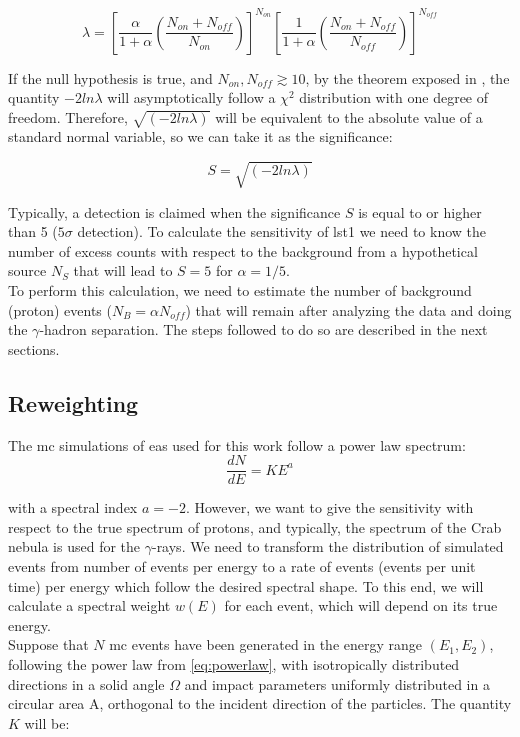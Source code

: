 \documentclass[main.tex]{subfiles}
\begin{document}
\begin{equation}
  \lambda = \left[ \frac{\alpha}{1+\alpha}\left( \frac{N_{on}+N_{off}}{N_{on}}\right) \right]^{N_{on}} \left[ \frac{1}{1+\alpha}\left( \frac{N_{on}+N_{off}}{N_{off}}\right)\right]^{N_{off}}
\end{equation}

If the null hypothesis is true, and $N_{on}, N_{off} \gtrsim 10$, by the theorem exposed in \cite{1983LiMa}, the quantity $-2ln\lambda$ will asymptotically follow a $\chi^2$ distribution with one degree of freedom. Therefore, $\sqrt{(-2ln\lambda)}$ will be equivalent to the absolute value of a standard normal variable, so we can take it as the significance:

\begin{equation}
  S = \sqrt{(-2ln\lambda)}
\end{equation}

Typically, a detection is claimed when the significance $S$ is equal to or higher than 5 ($5\sigma$ detection). To calculate the sensitivity of \gls{lst}1 we need to know the number of excess counts with respect to the background from a hypothetical source $N_{S}$ that will lead to $S=5$ for $\alpha=1/5$. \\
To perform this calculation, we need to estimate the number of background (proton) events ($N_{B} = \alpha N_{off}$) that will remain after analyzing the data and doing the $\gamma$-hadron separation. The steps followed to do so are described in the next sections.

\subsection{Reweighting}

The \gls{mc} simulations of \gls{eas} used for this work follow a power law spectrum:
\begin{equation} \label{eq:powerlaw}
\frac{dN}{dE} = K E^{a}
\end{equation}

with a spectral index $a=-2$. However, we want to give the sensitivity with respect to the true spectrum of protons, and typically, the spectrum of the Crab nebula is used for the $\gamma$-rays. We need to transform the distribution of simulated events from number of events per energy to a rate of events (events per unit time) per energy which follow the desired spectral shape. To this end, we will calculate a spectral weight $w(E)$ for each event, which will depend on its true energy.\\
Suppose that $N$ \gls{mc} events have been generated in the energy range $(E_1,E_2)$, following the power law from \ref{eq:powerlaw}, with isotropically distributed directions in a solid angle $\Omega$ and impact parameters uniformly distributed in a circular area A, orthogonal to the incident direction of the particles.
The quantity $K$ will be:
\end{document}
